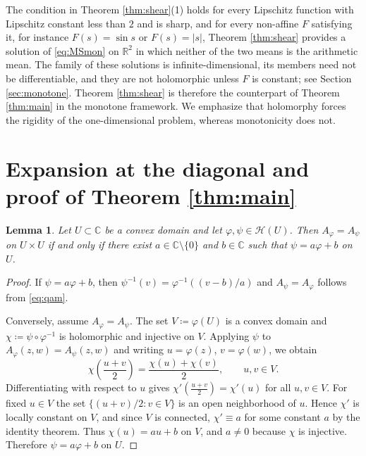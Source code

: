 \documentclass[a4paper, reqno, 11pt]{amsart}
\newtheorem{Lem}[Thm]{Lemma}
\theoremstyle{definition}
\begin{document}
The condition in Theorem \ref{thm:shear}(1) holds for every Lipschitz function with Lipschitz constant less than $2$ and is sharp, and for every non-affine $F$ satisfying it, for instance $F(s) = \sin s$ or $F(s) = |s|$, Theorem \ref{thm:shear} provides a solution of \eqref{eq:MSmon} on $\mathbb{R}^2$ in which neither of the two means is the arithmetic mean.
The family of these solutions is infinite-dimensional, its members need not be differentiable, and they are not holomorphic unless $F$ is constant; see Section \ref{sec:monotone}.
Theorem \ref{thm:shear} is therefore the counterpart of Theorem \ref{thm:main} in the monotone framework. 
We emphasize that holomorphy forces the rigidity of the one-dimensional problem, whereas monotonicity does not.


\section{Expansion at the diagonal and proof of Theorem \ref{thm:main}}\label{sec:proof}


\begin{Lem}\label{lem:affine}
Let $U \subset \mathbb{C}$ be a convex domain and let $\varphi, \psi \in \mathcal{H}(U)$.
Then $A_{\varphi} = A_{\psi}$ on $U \times U$ if and only if there exist $a \in \mathbb{C}\setminus\{0\}$ and $b \in \mathbb{C}$ such that $\psi = a\varphi + b$ on $U$.
\end{Lem}

\begin{proof}
If $\psi = a\varphi + b$, then $\psi^{-1}(v) = \varphi^{-1}((v-b)/a)$ and $A_{\psi} = A_{\varphi}$ follows from \eqref{eq:qam}.

Conversely, assume $A_{\varphi} = A_{\psi}$.
The set $V \coloneqq  \varphi(U)$ is a convex domain and $\chi \coloneqq  \psi \circ \varphi^{-1}$ is holomorphic and injective on $V$.
Applying $\psi$ to $A_{\varphi}(z,w) = A_{\psi}(z,w)$ and writing $u = \varphi(z)$, $v = \varphi(w)$, we obtain
\begin{equation*}
\chi\left(\frac{u+v}{2}\right) = \frac{\chi(u)+\chi(v)}{2}, \qquad u, v \in V .
\end{equation*}
Differentiating with respect to $u$ gives $\chi'\left(\frac{u+v}{2}\right) = \chi'(u)$ for all $u, v \in V$.
For fixed $u \in V$ the set $\{ (u+v)/2 : v \in V \}$ is an open neighborhood of $u$.
Hence $\chi'$ is locally constant on $V$, and since $V$ is connected, $\chi' \equiv a$ for some constant $a$ by the identity theorem.
Thus $\chi(u) = au + b$ on $V$, and $a \neq 0$ because $\chi$ is injective.
Therefore $\psi = a\varphi + b$ on $U$.
\end{proof}
\end{document}
